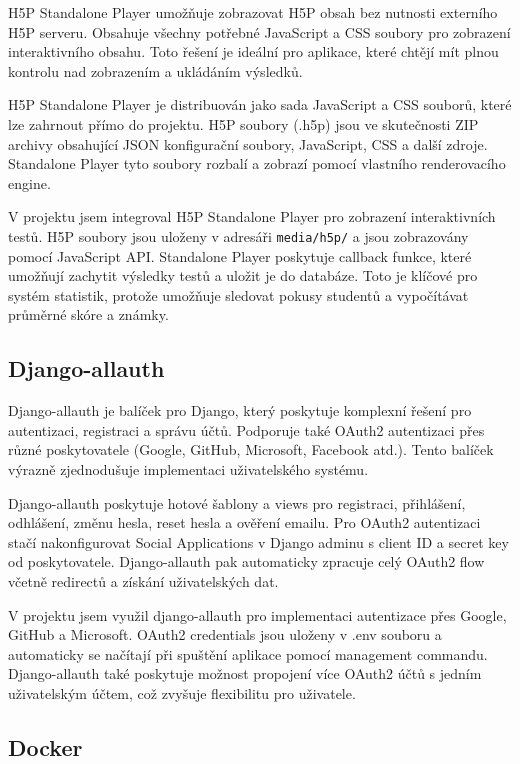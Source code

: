 \documentclass[a4paper,12pt]{article}
\begin{document}
H5P Standalone Player umožňuje zobrazovat H5P obsah bez nutnosti externího H5P serveru. Obsahuje všechny potřebné JavaScript a CSS soubory pro zobrazení interaktivního obsahu. Toto řešení je ideální pro aplikace, které chtějí mít plnou kontrolu nad zobrazením a ukládáním výsledků.

H5P Standalone Player je distribuován jako sada JavaScript a CSS souborů, které lze zahrnout přímo do projektu. H5P soubory (.h5p) jsou ve skutečnosti ZIP archivy obsahující JSON konfigurační soubory, JavaScript, CSS a další zdroje. Standalone Player tyto soubory rozbalí a zobrazí pomocí vlastního renderovacího engine.

V projektu jsem integroval H5P Standalone Player pro zobrazení interaktivních testů. H5P soubory jsou uloženy v adresáři \texttt{media/h5p/} a jsou zobrazovány pomocí JavaScript API. Standalone Player poskytuje callback funkce, které umožňují zachytit výsledky testů a uložit je do databáze. Toto je klíčové pro systém statistik, protože umožňuje sledovat pokusy studentů a vypočítávat průměrné skóre a známky.

\subsection{Django-allauth}

Django-allauth je balíček pro Django, který poskytuje komplexní řešení pro autentizaci, registraci a správu účtů. Podporuje také OAuth2 autentizaci přes různé poskytovatele (Google, GitHub, Microsoft, Facebook atd.). Tento balíček výrazně zjednodušuje implementaci uživatelského systému.

Django-allauth poskytuje hotové šablony a views pro registraci, přihlášení, odhlášení, změnu hesla, reset hesla a ověření emailu. Pro OAuth2 autentizaci stačí nakonfigurovat Social Applications v Django adminu s client ID a secret key od poskytovatele. Django-allauth pak automaticky zpracuje celý OAuth2 flow včetně redirectů a získání uživatelských dat.

V projektu jsem využil django-allauth pro implementaci autentizace přes Google, GitHub a Microsoft. OAuth2 credentials jsou uloženy v .env souboru a automaticky se načítají při spuštění aplikace pomocí management commandu. Django-allauth také poskytuje možnost propojení více OAuth2 účtů s jedním uživatelským účtem, což zvyšuje flexibilitu pro uživatele.

\subsection{Docker}
\end{document}
